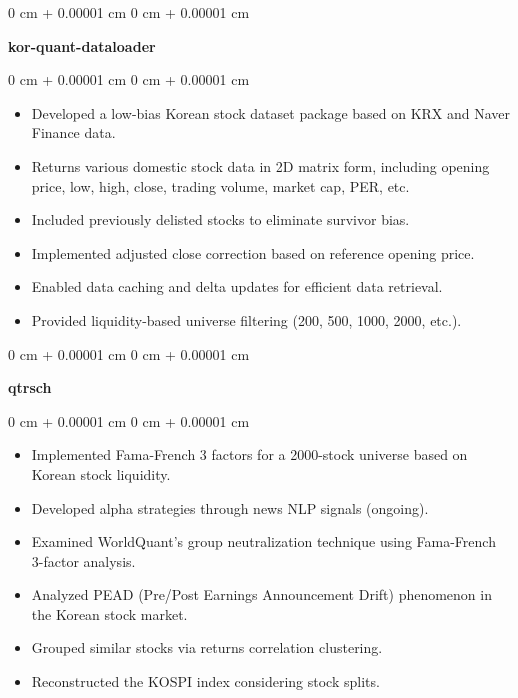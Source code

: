 \documentclass[10pt, letterpaper]{article}
\newenvironment{highlights}{
    \begin{itemize}[
        topsep=0.10 cm,
        parsep=0.10 cm,
        partopsep=0pt,
        itemsep=0pt,
        leftmargin=0 cm + 10pt
    ]
}{
    \end{itemize}
} %
\newenvironment{onecolentry}{
    \begin{adjustwidth}{
        0 cm + 0.00001 cm
    }{
        0 cm + 0.00001 cm
    }
}{
    \end{adjustwidth}
} %
\begin{document}
        
        \begin{onecolentry}
            \textbf{kor-quant-dataloader}\end{onecolentry}

        \vspace{0.10 cm}
        \begin{onecolentry}
            \begin{highlights}
                \item Developed a low-bias Korean stock dataset package based on KRX and Naver Finance data.
                \item Returns various domestic stock data in 2D matrix form, including opening price, low, high, close, trading volume, market cap, PER, etc.
                \item Included previously delisted stocks to eliminate survivor bias.
                \item Implemented adjusted close correction based on reference opening price.
                \item Enabled data caching and delta updates for efficient data retrieval.
                \item Provided liquidity-based universe filtering (200, 500, 1000, 2000, etc.).
            \end{highlights}
        \end{onecolentry}


        \vspace{0.2 cm}

        \begin{onecolentry}
            \textbf{qtrsch}\end{onecolentry}

        \vspace{0.10 cm}
        \begin{onecolentry}
            \begin{highlights}
                \item Implemented Fama-French 3 factors for a 2000-stock universe based on Korean stock liquidity.
                \item Developed alpha strategies through news NLP signals (ongoing).
                \item Examined WorldQuant's group neutralization technique using Fama-French 3-factor analysis.
                \item Analyzed PEAD (Pre/Post Earnings Announcement Drift) phenomenon in the Korean stock market.
                \item Grouped similar stocks via returns correlation clustering.
                \item Reconstructed the KOSPI index considering stock splits.
            \end{highlights}
        \end{onecolentry}
\end{document}
